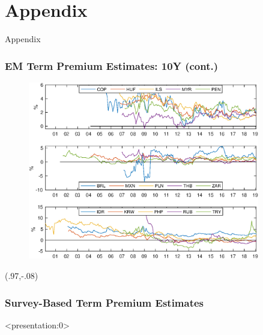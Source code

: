 \documentclass[12pt, aspectratio=169, xcolor=dvipsnames]{beamer} 			         %
\begin{document}
\section{Appendix}

\begin{frame}
	\begin{center}
		\huge \textcolor{yaleblue}{Appendix}
	\end{center}
\end{frame}

\begin{frame}[label=tp_10yrB]
	\frametitle{EM Term Premium Estimates: 10Y (cont.)}
	\begin{figure}[!htbp]
		\begin{center} %
			\includegraphics[trim={0 0 0 4cm},clip, width=0.9\textwidth,height=0.65\textheight]{../Figures/Temp/temp_tp10yrEM}
			\par\end{center}
	\end{figure}
	\begin{textblock*}{3cm}(.97\textwidth,-.08\textheight)
		\hyperlink{tp_10yrA}{}
	\end{textblock*}
\end{frame}

\begin{frame}
	\frametitle{Survey-Based Term Premium Estimates}
	
\end{frame}


\begin{frame}<presentation:0>
 

\end{frame}
\end{document}
